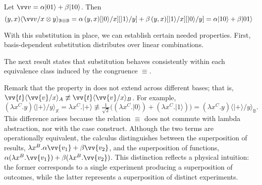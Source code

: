 \documentclass[runningheads,orivec,envcountsame,envcountsect]{llncs}
\providecommand{\qed}{\hbox{\rule{1ex}{1ex}}}%
\newcommand\ket[1]{\ensuremath{|#1\rangle}}
\newcommand\ansubst[2]{\ensuremath{\langle #1 \rangle_{#2}}}
\def\C{\mathbb{C}}            %
\def\Lam#1#2#3{\lambda#1^{#2}{.}#3} %
\newcommand\B{\mathbb B}
\newcommand\XB{\mathbb X}
\begin{document}
\begin{example}
  Let
  $\vv v = \alpha\ket{01}
           + \beta\ket{10}$.
  Then 
  \[
    (y,x)\ansubst{\vv v/x\otimes y}{\B\otimes\B}
    = \alpha\,(y,x)[\ket{0}/x][\ket{1}/y]
    + \beta\,(y,x)[\ket{1}/x][\ket{0}/y] 
    = 
    \alpha\ket{10}
    + \beta\ket{01}
  \]
\end{example}

With this substitution in place, we can establish certain needed properties.
First, basis-dependent substitution distributes over linear combinations.


The next result states that substitution behaves consistently within each
equivalence class induced by the congruence $\equiv$.


Remark that the property in  does not extend across
  different bases; that is,
  $\vv{t}\ansubst{\vv{v}/x}{A}\not\equiv\vv{t}\ansubst{\vv{v}/x}{B}$.
  For example,
  \[
    (\Lam{x}{C}{y})\ansubst{\ket{+}/y}{\XB}
    = \Lam{x}{C}{\ket{+}} 
    \not\equiv
    \tfrac{1}{\sqrt{2}}\big((\Lam{x}{C}{\ket{0}})
    + (\Lam{x}{C}{\ket{1}})\big)
    = (\Lam{x}{C}{y})\ansubst{\ket{+}/y}{\B}.
  \]
  This difference arises because the relation $\equiv$ does not commute with
  lambda abstraction, nor with the case construct. Although the two terms are
  operationally equivalent, the calculus distinguishes between the
  superposition of results,
  $\Lam{x}{B}{\alpha\vv{v_1} + \beta\vv{v_2}}$,
  and the superposition of functions,
  $\alpha(\Lam{x}{B}{\vv{v_1}}) + \beta(\Lam{x}{B}{\vv{v_2}})$.
  This distinction reflects a physical intuition: the former corresponds to a
  single experiment producing a superposition of outcomes, while the latter
  represents a superposition of distinct experiments.
\end{document}
